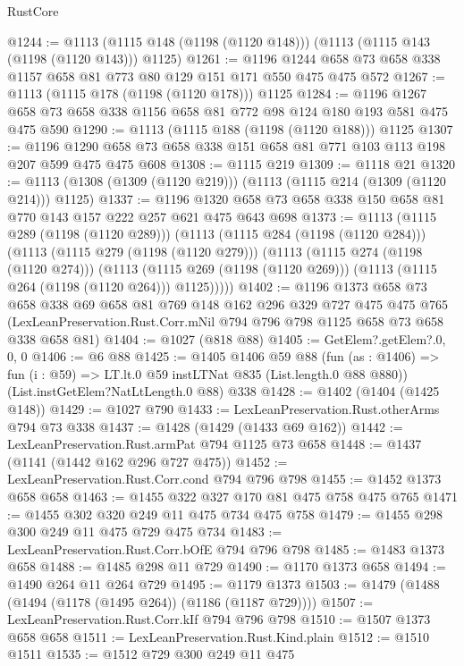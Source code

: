 \begin{lexlean}{RustCore}
\begin{coremodule}
@1244 := @1113 (@1115 @148 (@1198 (@1120 @148))) (@1113 (@1115 @143 (@1198 (@1120 @143))) @1125)
@1261 := @1196 @1244 @658 @73 @658 @338 @1157 @658 @81 @773 @80 @129 @151 @171 @550 @475 @475 @572
@1267 := @1113 (@1115 @178 (@1198 (@1120 @178))) @1125
@1284 := @1196 @1267 @658 @73 @658 @338 @1156 @658 @81 @772 @98 @124 @180 @193 @581 @475 @475 @590
@1290 := @1113 (@1115 @188 (@1198 (@1120 @188))) @1125
@1307 := @1196 @1290 @658 @73 @658 @338 @151 @658 @81 @771 @103 @113 @198 @207 @599 @475 @475 @608
@1308 := @1115 @219
@1309 := @1118 @21
@1320 := @1113 (@1308 (@1309 (@1120 @219))) (@1113 (@1115 @214 (@1309 (@1120 @214))) @1125)
@1337 := @1196 @1320 @658 @73 @658 @338 @150 @658 @81 @770 @143 @157 @222 @257 @621 @475 @643 @698
@1373 := @1113
    (@1115 @289 (@1198 (@1120 @289)))
    (@1113
      (@1115 @284 (@1198 (@1120 @284)))
      (@1113
        (@1115 @279 (@1198 (@1120 @279)))
        (@1113
          (@1115 @274 (@1198 (@1120 @274)))
          (@1113
            (@1115 @269 (@1198 (@1120 @269)))
            (@1113 (@1115 @264 (@1198 (@1120 @264))) @1125)))))
@1402 := @1196
    @1373
    @658
    @73
    @658
    @338
    @69
    @658
    @81
    @769
    @148
    @162
    @296
    @329
    @727
    @475
    @475
    @765
    (LexLeanPreservation.Rust.Corr.mNil @794 @796 @798 @1125 @658 @73 @658 @338 @658 @81)
@1404 := @1027 (@818 @88)
@1405 := GetElem?.getElem?.{0, 0, 0}
@1406 := @6 @88
@1425 := @1405
    @1406
    @59
    @88
    (fun (as : @1406) => fun (i : @59) => LT.lt.{0} @59 instLTNat @835 (List.length.{0} @88 @880))
    (List.instGetElem?NatLtLength.{0} @88)
    @338
@1428 := @1402 (@1404 (@1425 @148))
@1429 := @1027 @790
@1433 := LexLeanPreservation.Rust.otherArms @794 @73 @338
@1437 := @1428 (@1429 (@1433 @69 @162))
@1442 := LexLeanPreservation.Rust.armPat @794 @1125 @73 @658
@1448 := @1437 (@1141 (@1442 @162 @296 @727 @475))
@1452 := LexLeanPreservation.Rust.Corr.cond @794 @796 @798
@1455 := @1452 @1373 @658 @658
@1463 := @1455 @322 @327 @170 @81 @475 @758 @475 @765
@1471 := @1455 @302 @320 @249 @11 @475 @734 @475 @758
@1479 := @1455 @298 @300 @249 @11 @475 @729 @475 @734
@1483 := LexLeanPreservation.Rust.Corr.bOfE @794 @796 @798
@1485 := @1483 @1373 @658
@1488 := @1485 @298 @11 @729
@1490 := @1170 @1373 @658
@1494 := @1490 @264 @11 @264 @729
@1495 := @1179 @1373
@1503 := @1479 (@1488 (@1494 (@1178 (@1495 @264)) (@1186 (@1187 @729))))
@1507 := LexLeanPreservation.Rust.Corr.kIf @794 @796 @798
@1510 := @1507 @1373 @658 @658
@1511 := LexLeanPreservation.Rust.Kind.plain
@1512 := @1510 @1511
@1535 := @1512
    @729
    @300
    @249
    @11
    @475

\end{coremodule}
\end{lexlean}
